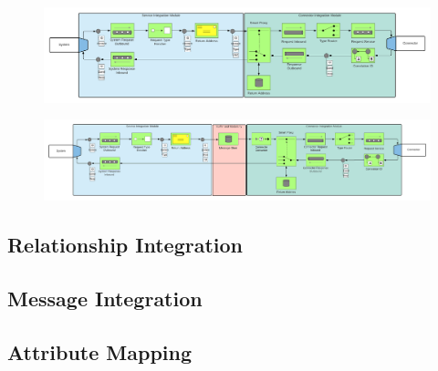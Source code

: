 \begin{figure}[h]
    \centering
    \includegraphics[scale=0.15]{Diagrams/Integration Architecture 1/Technological Integration/Connector/6. Integration Modules.png}
\end{figure}

\begin{figure}[h]
    \centering
    \includegraphics[scale=0.15]{Diagrams/Integration Architecture 1/Technological Integration/Connector/7. Buffer Modularity.png}
\end{figure}


\subsection{Relationship Integration}

\subsection{Message Integration}

\subsection{Attribute Mapping}
